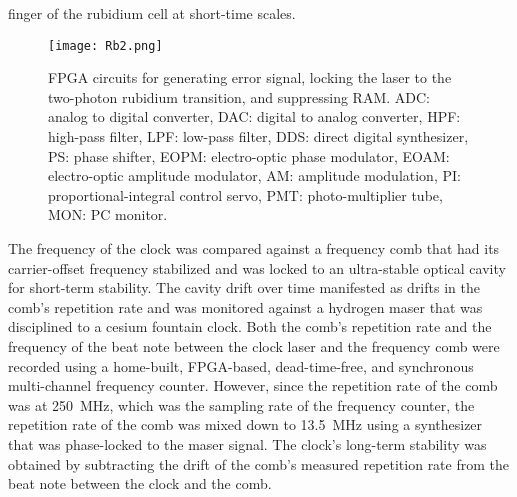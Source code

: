 \documentclass[aip,graphicx]{revtex4-2}
\begin{document}
finger of the rubidium cell at short-time scales. 
	
	\begin{figure}
		\centering\texttt{[image: Rb2.png]}
		\caption{\label{fig:Rb2} FPGA circuits for generating error signal, locking the laser to the two-photon rubidium transition, and suppressing RAM. ADC: analog to digital converter, DAC: digital to analog converter, HPF: high-pass filter, LPF: low-pass filter, DDS: direct digital synthesizer, PS: phase shifter, EOPM: electro-optic phase modulator, EOAM: electro-optic amplitude modulator, AM: amplitude modulation, PI: proportional-integral control servo, PMT: photo-multiplier tube, MON: PC monitor.}
	\end{figure}
	
	The frequency of the clock was compared against a frequency comb that had its carrier-offset frequency stabilized and was locked to an ultra-stable optical cavity for short-term stability. The cavity drift over time manifested as drifts in the comb’s repetition rate and was monitored against a hydrogen maser that was disciplined to a cesium fountain clock. Both the comb’s repetition rate and the frequency of the beat note between the clock laser and the frequency comb were recorded using a home-built, FPGA-based, dead-time-free, and synchronous multi-channel frequency counter. However, since the repetition rate of the comb was at 250~MHz, which was the sampling rate of the frequency counter, the repetition rate of the comb was mixed down to 13.5~MHz using a synthesizer that was phase-locked to the maser signal. The clock’s long-term stability was obtained by subtracting the drift of the comb’s measured repetition rate from the beat note between the clock and the comb.
	
\end{document}
